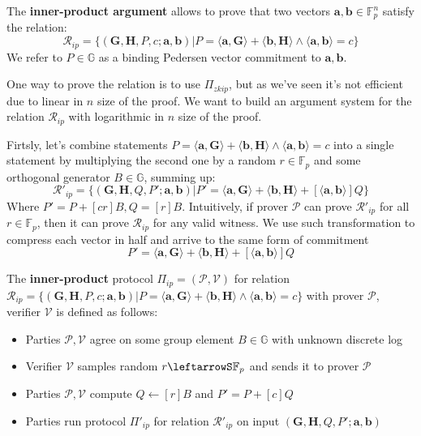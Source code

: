 \documentclass[../lecture-notes-148x210.tex]{subfiles}
\begin{document}
The \textbf{inner-product argument} allows to prove that two vectors $\mathbf{a,b} \in \mathbb{F}_p^n$ satisfy the relation:
$$\mathcal{R}_{ip} = \{ (\mathbf{G,H}, P, c; \mathbf{a,b}) \vert P = \langle \mathbf{a,G} \rangle + \langle \mathbf{b,H} \rangle \wedge \langle \mathbf{a,b} \rangle = c \}$$
We refer to $P \in \mathbb{G}$ as a binding Pedersen vector commitment to $\mathbf{a,b}$.

One way to prove the relation is to use $\Pi_{zkip}$, but as we've seen it's not efficient due to linear in $n$ size of the proof. We want to build an argument system for the relation $\mathcal{R}_{ip}$ with logarithmic in $n$ size of the proof.

Firtsly, let's combine statements $P = \langle \mathbf{a,G} \rangle + \langle \mathbf{b,H} \rangle \wedge \langle \mathbf{a,b} \rangle = c$ into a single statement by multiplying the second one by a random $r \in \mathbb{F}_p$ and some orthogonal generator $B \in \mathbb{G}$, summing up:
$$
\mathcal{R}'_{ip} = \{ (\mathbf{G,H}, Q, P'; \mathbf{a,b}) \vert P' = \langle \mathbf{a,G} \rangle + \langle \mathbf{b,H} \rangle + [\langle \mathbf{a,b} \rangle]Q \}
$$
Where $P' = P + [cr]B, Q=[r]B$. Intuitively, if prover $\mathcal{P}$ can prove $\mathcal{R}'_{ip}$ for all $r \in \mathbb{F}_p$, then it can prove $\mathcal{R}_{ip}$ for any valid witness. We use such transformation to compress each vector in half and arrive to the same form of commitment
$$P' = \langle \mathbf{a,G} \rangle + \langle \mathbf{b,H} \rangle + [\langle \mathbf{a,b} \rangle]Q$$

\begin{definition}
    The \textbf{inner-product} protocol $\Pi_{ip} = (\mathcal{P}, \mathcal{V})$ for relation $\mathcal{R}_{ip} = \{ (\mathbf{G,H}, P, c; \mathbf{a,b}) \vert P = \langle \mathbf{a,G} \rangle + \langle \mathbf{b,H} \rangle \wedge \langle \mathbf{a,b} \rangle = c \}$ with prover $\mathcal{P}$, verifier $\mathcal{V}$ is defined as follows:
    \begin{itemize}
        \item Parties $\mathcal{P, V}$ agree on some group element $B \in \mathbb{G}$ with unknown discrete log
        \item Verifier $\mathcal{V}$ samples random $r \leftarrowS \mathbb{F}_p$ and sends it to prover $\mathcal{P}$
        \item Parties $\mathcal{P, V}$ compute $Q \gets [r]B$ and $P' = P + [c]Q$
        \item Parties run protocol $\Pi'_{ip}$ for relation $\mathcal{R}'_{ip}$ on input $(\mathbf{G,H}, Q, P'; \mathbf{a,b})$
    \end{itemize}
\end{definition}
\end{document}
